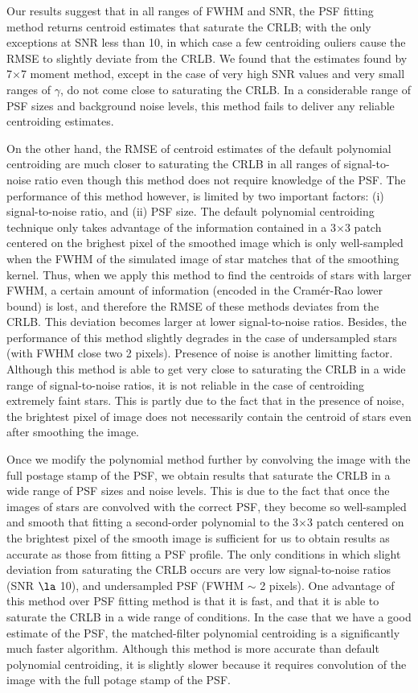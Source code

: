 \documentclass[12pt, preprint]{aastex}
\begin{document}
Our results suggest that in all ranges of FWHM and SNR, the PSF fitting method returns 
centroid estimates that saturate the CRLB; with the only exceptions at SNR less than 10, 
in which case a few centroiding ouliers cause the RMSE to slightly deviate
from the CRLB. We found that the estimates found by 7$\times$7 moment method, except in the case of
very high SNR values and very small ranges of $\gamma$, do not come close to
saturating the CRLB. In a considerable range of PSF sizes and background noise levels, 
this method fails to deliver any reliable centroiding estimates.
 
On the other hand, the RMSE of centroid estimates of the default polynomial centroiding are much 
closer to saturating the CRLB in all ranges of signal-to-noise ratio even though this method does not require knowledge of 
the PSF.
The performance of this method however, is limited by
two important factors: (i) signal-to-noise ratio, and (ii) PSF size.
The default polynomial centroiding technique only takes advantage of the information 
contained in a 3$\times$3 patch centered on the brighest pixel of the smoothed image which is only 
well-sampled when the FWHM of the simulated image of star 
matches that of the smoothing kernel. Thus, when we apply 
this method to find the centroids of stars with larger FWHM, a certain amount of
information (encoded in the Cram\'{e}r-Rao lower bound) is lost, and therefore the RMSE
of these methods deviates from the CRLB. This deviation becomes larger at lower
signal-to-noise ratios. Besides, the performance of this method slightly degrades
in the case of undersampled stars (with FWHM close two 2 pixels). 
Presence of noise is another limitting factor.
Although this method is able to get very close to saturating the CRLB in a wide range of
signal-to-noise ratios, it is not reliable in the case of centroiding extremely faint stars. 
This is partly due to the fact that in the presence of noise, 
the brightest pixel of image does not necessarily contain the centroid of stars even after smoothing 
the image.

Once we modify the polynomial method further by convolving the image with the full postage stamp
of the PSF, we obtain results that saturate the CRLB in a wide range of PSF sizes and noise levels.  
This is due to the fact that once the images of stars are convolved with the correct PSF, they become so well-sampled and smooth
that fitting a second-order polynomial to the 3$\times$3 patch centered on the brightest pixel of the smooth image is sufficient for us to obtain
results as accurate as those from fitting a PSF profile. The only conditions in which slight deviation from
saturating the CRLB occurs are very low signal-to-noise ratios (SNR $\la$ 10), and undersampled PSF (FWHM $\sim$ 2 pixels).
One advantage of this method over PSF fitting method is that it is fast, and that it is able to saturate the CRLB in 
a wide range of conditions. In the case that we have a good estimate of the PSF, the 
matched-filter polynomial centroiding is a significantly much faster algorithm. 
Although this method is more accurate than default polynomial centroiding, it is
slightly slower because it requires convolution of the image with the full potage stamp of the PSF. 
\end{document}
